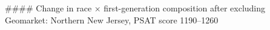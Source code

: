 #### Change in race × first-generation composition after excluding Geomarket: Northern New Jersey, PSAT score 1190–1260
